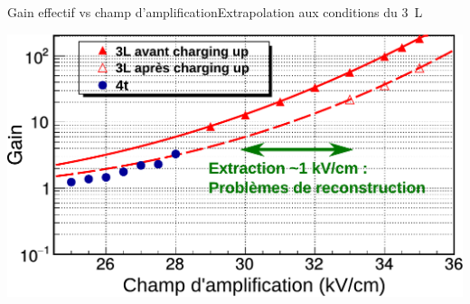     \begin{frame}{Gain effectif vs champ d'amplification}{Extrapolation aux conditions du \SI{3}{\liter}}
        \begin{scriptsize}
            \centering \includegraphics[width=\textwidth]{./pictures/gain_vs_ampli_circle.pdf} \\ 
        \end{scriptsize}
    \end{frame}
     
